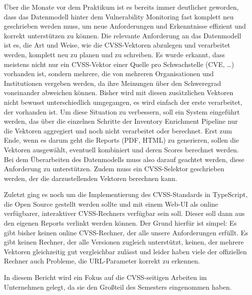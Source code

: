 \begin{smitemize}
    \item Über die Monate vor dem Praktikum ist es bereits immer deutlicher geworden, dass das Datenmodell hinter dem Vulnerability Monitoring fast komplett neu geschrieben werden muss, um neue Anforderungen und Erkenntnisse effizient und korrekt unterstützen zu können.
    Die relevante Anforderung an das Datenmodell ist es, die Art und Weise, wie die CVSS-Vektoren abzulegen und verarbeitet werden, komplett neu zu planen und zu schreiben.
    Es wurde erkannt, dass meistens nicht nur ein CVSS-Vektor einer Quelle pro Schwachstelle (CVE, \ldots) vorhanden ist, sondern mehrere, die von mehreren Organisationen und Institutionen vergeben werden, da ihre Meinungen über den Schweregrad voneinander abweichen können.
    Bisher wird mit diesen zusätzlichen Vektoren nicht bewusst unterschiedlich umgegangen, es wird einfach der erste verarbeitet, der vorhanden ist.
    Um diese Situation zu verbessern, soll ein System eingeführt werden, das über die einzelnen Schritte der Inventory Enrichment Pipeline nur die Vektoren aggregiert und noch nicht verarbeitet oder berechnet.
    Erst zum Ende, wenn es darum geht die Reports (PDF, HTML) zu generieren, sollen die Vektoren ausgewählt, eventuell kombiniert und deren Scores berechnet werden.
    Bei dem Überarbeiten des Datenmodells muss also darauf geachtet werden, diese Anforderung zu unterstützen.
    Zudem muss ein CVSS-Selektor geschrieben werden, der die darzustellenden Vektoren berechnen kann.
    \item Zuletzt ging es noch um die Implementierung des CVSS-Standards in TypeScript, die Open Source gestellt werden sollte und mit einem Web-UI als online verfügbarer, interaktiver CVSS-Rechners verfügbar sein soll.
    Dieser soll dann aus den eigenen Reports verlinkt werden können.
    Der Grund hierfür ist simpel: Es gibt bisher keinen online CVSS-Rechner, der alle unsere Anforderungen erfüllt.
    Es gibt keinen Rechner, der alle Versionen zugleich unterstützt, keinen, der mehrere Vektoren gleichzeitig gut vergleichbar zulässt und leider haben viele der offiziellen Rechner auch Probleme, die URL-Parameter korrekt zu erkennen.
\end{smitemize}

In diesem Bericht wird ein Fokus auf die CVSS-seitigen Arbeiten im Unternehmen gelegt, da sie den Großteil des Semesters eingenommen haben.
